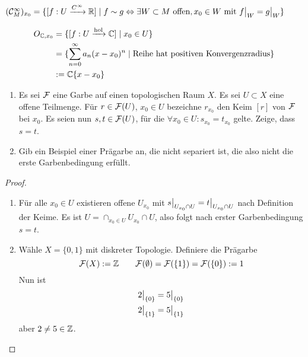 \begin{beispiel}
	$(\mathcal C^\infty_M)_{x_0} = \{ [f: U \xrightarrow{C^\infty} \mathbb{R}]\mid
  	f\sim g \Leftrightarrow \exists W\subset M\text{ offen}, x_0 \in W
  	\text{ mit } f\big|_{W} = g\big|_{W}\}$
\end{beispiel}
\begin{beispiel}
	\begin{align*}
	  	O_{\mathbb{C},x_0} &= \{[f:U \xrightarrow{\text{hol}} \mathbb{C}] \mid x_0 \in U\}\\
	  	&= \{\sum_{n=0}^\infty a_n(x-x_0)^n \mid \text{Reihe hat positiven 
	  	Konvergenzradius}\}\\
	  	&:= \mathbb{C}\{x-x_0\}
	\end{align*}
\end{beispiel}



\begin{uebung}
	\begin{enumerate}
	  \item Es sei $\mathcal{F}$ eine Garbe auf einen topologischen Raum $X$.
	  Es sei $U\subset X$ eine offene Teilmenge. Für $r\in \mathcal{F}(U)$, $x_0 \in U$
	  bezeichne $r_{x_0}$ den Keim $[r]$ von $\mathcal{F}$ bei $x_0$. Es seien
	  nun $s,t \in \mathcal{F}(U)$, für die $\forall x_0 \in U: s_{x_0} = t_{x_0}$ 
	  gelte. Zeige, dass $s=t$.
	  \item Gib ein Beispiel einer Prägarbe an, die nicht separiert ist,
	  die also nicht die erste Garbenbedingung erfüllt.
	\end{enumerate}
\end{uebung}
\begin{proof}
	\begin{enumerate}
	  \item Für alle $x_0 \in U$ existieren offene $U_{x_0}$ mit
	  	$s \big|_{U_{x_0} \cap U} = t\big|_{U_{x_0} \cap U}$ nach Definition
	  	der Keime. Es ist $U = \cap_{x_0 \in U} U_{x_0} \cap U$, also
	  	folgt nach erster Garbenbedingung $s=t$.
	  \item Wähle $X = \{0,1\}$ mit diskreter Topologie.
	  	Definiere die Prägarbe
	  	\[\mathcal{F}(X) := \mathbb{Z} \qquad \mathcal{F}(\emptyset) = \mathcal{F}(\{1\}) = \mathcal{F}(\{0\}) := 1\]
	  	Nun ist
	  	\begin{align*}
	  		2\big|_{\{0\}} &= 5\big|_{\{0\}} \\
	  		2\big|_{\{1\}} &= 5\big|_{\{1\}}
	  	\end{align*}
	  	aber $2\neq 5 \in \mathbb{Z}$.
	\end{enumerate}
\end{proof}

